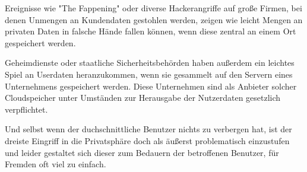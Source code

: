 Ereignisse wie "The Fappening" oder diverse Hackerangriffe auf große Firmen, bei
denen Unmengen an Kundendaten gestohlen werden, zeigen wie leicht Mengen an
privaten Daten in falsche Hände fallen können, wenn diese zentral an einem Ort
gespeichert werden.

Geheimdienste oder staatliche Sicherheitsbehörden haben außerdem ein leichtes
Spiel an Userdaten heranzukommen, wenn sie gesammelt auf den Servern eines
Unternehmens gespeichert werden. Diese Unternehmen sind als Anbieter solcher
Cloudspeicher unter Umständen zur Herausgabe der Nutzerdaten gesetzlich
verpflichtet.

Und selbst wenn der duchschnittliche Benutzer nichts zu verbergen hat, ist der
dreiste Eingriff in die Privatsphäre doch als äußerst problematisch einzustufen
und leider gestaltet sich dieser zum Bedauern der betroffenen Benutzer, für
Fremden oft viel zu einfach.
